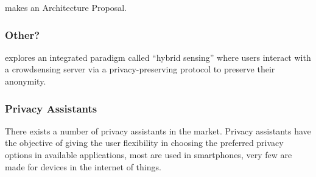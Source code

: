 \documentclass[conference]{IEEEtran}
\begin{document}
\cite{AntunesFederated} makes an Architecture Proposal.

\subsubsection{Other?}

\cite{ZhuIntegrating} explores an integrated paradigm called ``hybrid sensing'' where users interact with a crowdsensing server via a privacy-preserving protocol to preserve their anonymity.

\subsubsection{Privacy Assistants}

There exists a number of privacy assistants in the market. Privacy assistants
have the objective of giving the user flexibility in choosing the
preferred privacy options in available applications, most are used in
smartphones, very few are made for devices in the internet of things.
\end{document}
